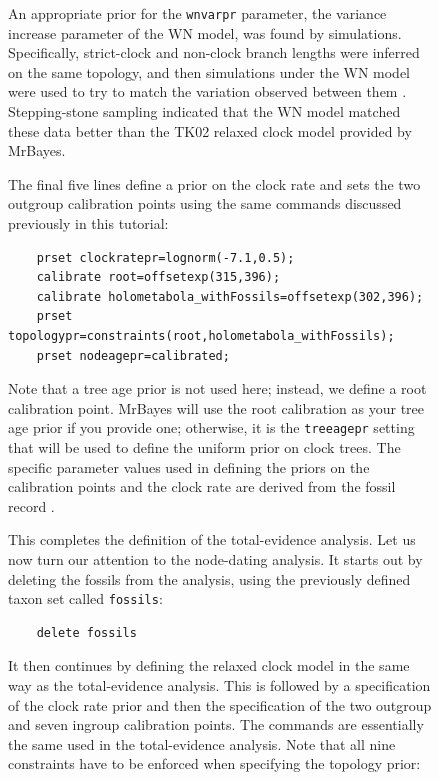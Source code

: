 \documentclass[12pt]{book}
\newcommand{\ttt}[1]{\texttt{#1}}
\begin{document}
\begin{figure}[h]
An appropriate prior for the \ttt{wnvarpr} parameter, the variance increase parameter of the WN
model, was found by simulations. Specifically, strict-clock and non-clock branch lengths were
inferred on the same topology, and then simulations under the WN model were used to try to match
the variation observed between them \citep{ronquist12b}. Stepping-stone sampling indicated that the
WN model matched these data better than the TK02 relaxed clock model provided by MrBayes.

The final five lines define a prior on the clock rate and sets the two outgroup calibration points
using the same commands discussed previously in this tutorial:

\small
\begin{singlespacing}
\begin{verbatim}
    prset clockratepr=lognorm(-7.1,0.5);
    calibrate root=offsetexp(315,396);
    calibrate holometabola_withFossils=offsetexp(302,396);
    prset topologypr=constraints(root,holometabola_withFossils);
    prset nodeagepr=calibrated;
\end{verbatim}
\end{singlespacing}
\normalsize

Note that a tree age prior is not used here; instead, we define a root calibration point. MrBayes
will use the root calibration as your tree age prior if you provide one; otherwise, it is the
\ttt{treeagepr} setting that will be used to define the uniform prior on clock trees. The specific
parameter values used in defining the priors on the calibration points and the clock rate are
derived from the fossil record \citep{ronquist12b}.

This completes the definition of the total-evidence analysis. Let us now turn our attention to the
node-dating analysis. It starts out by deleting the fossils from the analysis, using the previously
defined taxon set called \ttt{fossils}:

\small
\begin{verbatim}
    delete fossils
\end{verbatim}
\normalsize

It then continues by defining the relaxed clock model in the same way as the total-evidence
analysis. This is followed by a specification of the clock rate prior and then the specification of
the two outgroup and seven ingroup calibration points. The commands are essentially the same used
in the total-evidence analysis. Note that all nine constraints have to be enforced when specifying
the topology prior:


\end{figure}
\end{document}
